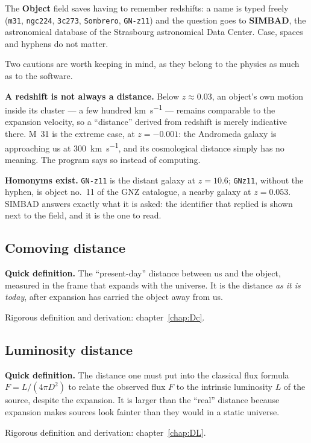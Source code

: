 \documentclass[11pt,a4paper,openany]{report}
\begin{document}
\begin{tcolorbox}[gui]
The \textbf{Object} field saves having to remember redshifts: a name is typed
freely (\texttt{m31}, \texttt{ngc224}, \texttt{3c273}, \texttt{Sombrero},
\texttt{GN-z11}) and the question goes to \textbf{SIMBAD}, the astronomical
database of the Strasbourg astronomical Data Center. Case, spaces and hyphens
do not matter.

\medskip
Two cautions are worth keeping in mind, as they belong to the physics as much
as to the software.

\medskip
\textbf{A redshift is not always a distance.} Below $z \approx 0.03$, an
object's own motion inside its cluster --- a few hundred
\si{\km\per\second} --- remains comparable to the expansion velocity, so a
``distance'' derived from redshift is merely indicative there. M~31 is the
extreme case, at $z = -0.001$: the Andromeda galaxy is approaching us at
\SI{300}{\km\per\second}, and its cosmological distance simply has no meaning.
The program says so instead of computing.

\medskip
\textbf{Homonyms exist.} \texttt{GN-z11} is the distant galaxy at $z = 10.6$;
\texttt{GNz11}, without the hyphen, is object no.~11 of the GNZ catalogue, a
nearby galaxy at $z = 0.053$. SIMBAD answers exactly what it is asked: the
identifier that replied is shown next to the field, and it is the one to read.
\end{tcolorbox}

\subsection{Comoving distance}

\begin{tcolorbox}[gui]
\textbf{Quick definition.} The “present-day” distance between us and the
object, measured in the frame that expands with the universe. It is the
distance \emph{as it is today}, after expansion has carried the object away
from us.

\medskip
Rigorous definition and derivation: chapter~\ref{chap:Dc}.
\end{tcolorbox}

\subsection{Luminosity distance}

\begin{tcolorbox}[gui]
\textbf{Quick definition.} The distance one must put into the classical flux
formula $F = L/(4\pi D^2)$ to relate the observed flux $F$ to the intrinsic
luminosity $L$ of the source, despite the expansion. It is larger than the
“real” distance because expansion makes sources look fainter than they would
in a static universe.

\medskip
Rigorous definition and derivation: chapter~\ref{chap:DL}.
\end{tcolorbox}
\end{document}
